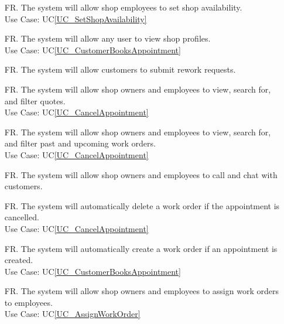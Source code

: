 \documentclass[12pt]{article}
\newcounter{reqnum} %
\begin{document}
\begin{itemize}
\item[FR\refstepcounter{reqnum}\thereqnum \label{R_SetShopAvailability}.] The system will allow shop employees to set shop availability.\\
Use Case: UC\ref{UC_SetShopAvailability}

\item[FR\refstepcounter{reqnum}\thereqnum \label{R_ViewShop}.] The system will allow any user to view shop profiles.\\
Use Case: UC\ref{UC_CustomerBooksAppointment}

\item[FR\refstepcounter{reqnum}\thereqnum \label{R_ReworkRequest}.] The system will allow customers to submit rework requests.

\item[FR\refstepcounter{reqnum}\thereqnum \label{R_ViewQuotes}.] The system will allow shop owners and employees to view, search for, and filter quotes.\\
Use Case: UC\ref{UC_CancelAppointment}

\item[FR\refstepcounter{reqnum}\thereqnum \label{R_ViewWorkOrder}.] The system will allow shop owners and employees to view, search for, and filter past and upcoming work orders.\\
Use Case: UC\ref{UC_CancelAppointment}

\item[FR\refstepcounter{reqnum}\thereqnum \label{R_CustomerCommunication}.] The system will allow shop owners and employees to call and chat with customers.

\item[FR\refstepcounter{reqnum}\thereqnum \label{R_AutoDeleteWorkOrder}.] The system will automatically delete a work order if the appointment is cancelled.\\
Use Case: UC\ref{UC_CancelAppointment}

\item[FR\refstepcounter{reqnum}\thereqnum \label{R_AutoCreateWorkOrder}.] The system will automatically create a work order if an appointment is created.\\
Use Case: UC\ref{UC_CustomerBooksAppointment}

\item[FR\refstepcounter{reqnum}\thereqnum \label{R_AssignWorkOrder}.] The system will allow shop owners and employees to assign work orders to employees.\\
Use Case: UC\ref{UC_AssignWorkOrder}


\end{itemize}
\end{document}
